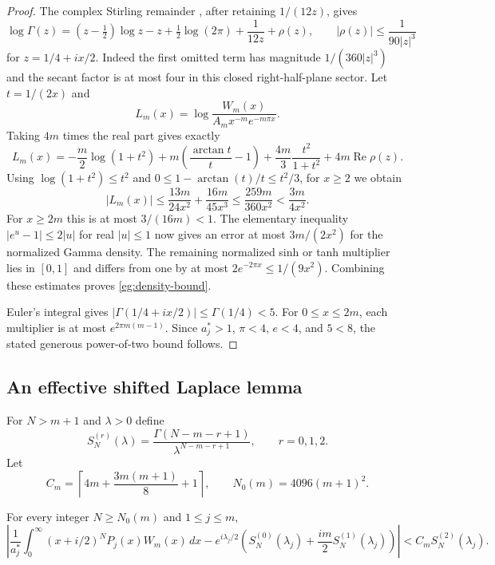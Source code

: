 \begin{proof}
The complex Stirling remainder \cite[\S5.11(ii)]{DLMF}, after retaining $1/(12z)$, gives
\[
 \log\Gamma(z)=(z-\tfrac12)\log z-z+\tfrac12\log(2\pi)
                        +\frac1{12z}+\rho(z),\qquad
 |\rho(z)|\le\frac1{90|z|^3}
\]
for $z=1/4+ix/2$.  Indeed the first omitted term has magnitude
$1/(360|z|^3)$ and the secant factor is at most four in this
closed right-half-plane sector.  Let $t=1/(2x)$ and
\[
 L_m(x)=\log\frac{W_m(x)}{A_mx^{-m}e^{-m\pi x}}.
\]
Taking $4m$ times the real part gives exactly
\[
 L_m(x)=-\frac m2\log(1+t^2)
      +m\left(\frac{\arctan t}{t}-1\right)
      +\frac{4m}{3}\frac{t^2}{1+t^2}+4m\operatorname{Re}\rho(z).
\]
Using $\log(1+t^2)\le t^2$ and
$0\le1-\arctan(t)/t\le t^2/3$, for $x\ge2$ we obtain
\begin{equation}\label{eg:log-density}
 |L_m(x)|\le\frac{13m}{24x^2}+\frac{16m}{45x^3}
          \le\frac{259m}{360x^2}<\frac{3m}{4x^2}.
\end{equation}
For $x\ge2m$ this is at most $3/(16m)<1$.  The elementary
inequality $|e^u-1|\le2|u|$ for real $|u|\le1$ now gives
an error at most $3m/(2x^2)$ for the normalized Gamma density.
The remaining normalized sinh or tanh multiplier lies in $[0,1]$
and differs from one by at most $2e^{-2\pi x}\le1/(9x^2)$.
Combining these estimates proves \eqref{eg:density-bound}.

Euler's integral gives $|\Gamma(1/4+ix/2)|\le\Gamma(1/4)<5$.
For $0\le x\le2m$, each multiplier is at most
$e^{2\pi m(m-1)}$.  Since $a_j^*>1$, $\pi<4$, $e<4$,
and $5<8$, the stated generous power-of-two bound follows.
\end{proof}

\subsection{An effective shifted Laplace lemma}

For $N>m+1$ and $\lambda>0$ define
\[
 S_N^{(r)}(\lambda)=
       \frac{\Gamma(N-m-r+1)}{\lambda^{N-m-r+1}},
       \qquad r=0,1,2.
\]
Let
\begin{equation}\label{eg:constants}
 C_m=\left\lceil4m+\frac{3m(m+1)}8+1\right\rceil,
 \qquad N_0(m)=4096(m+1)^2.
\end{equation}

\begin{lemma}\label{eg:laplace}
For every integer $N\ge N_0(m)$ and $1\le j\le m$,
\begin{equation}\label{eg:laplace-bound}
 \left|\frac1{a_j^*}\int_0^\infty(x+i/2)^NP_j(x)W_m(x)\,dx
   -e^{i\lambda_j/2}\left(S_N^{(0)}(\lambda_j)
                 +\frac{im}{2}S_N^{(1)}(\lambda_j)\right)\right|
       < C_m S_N^{(2)}(\lambda_j).
\end{equation}
\end{lemma}


